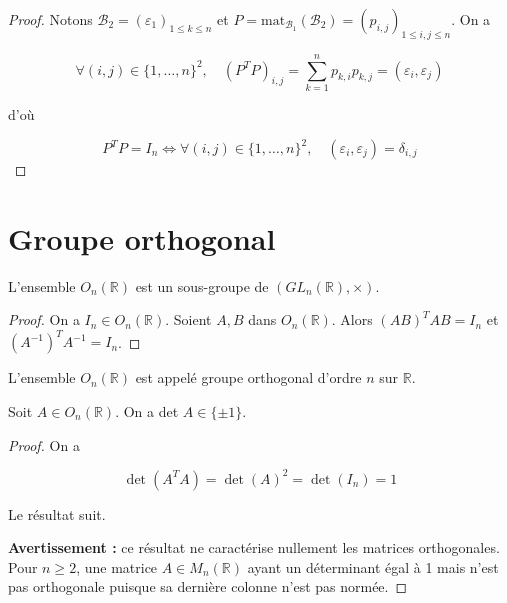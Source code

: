 \begin{proof}

Notons $\mathcal{B}_2 = (\varepsilon_1)_{1 \leq k \leq n}$ et $P = \text{mat}_{\mathcal{B}_1}(\mathcal{B}_2) = (p_{i,j})_{1 \leq i,j \leq n}$. On a

\[ \forall (i,j) \in \{1, \dots, n\}^2, \quad (P^T P)_{i,j} = \sum_{k=1}^n p_{k,i} p_{k,j} = (\varepsilon_i, \varepsilon_j) \]

d'où

\[ P^T P = I_n \Leftrightarrow \forall (i,j) \in \{1, \dots, n\}^2, \quad (\varepsilon_i, \varepsilon_j) = \delta_{i,j} \]

\end{proof}

\section{Groupe orthogonal}

\begin{proposition}
\label{prop:16}

L'ensemble $O_n(\mathbb{R})$ est un sous-groupe de $(GL_n(\mathbb{R}), \times)$.

\end{proposition}

\begin{proof}

On a $I_n \in O_n(\mathbb{R})$. Soient $A, B$ dans $O_n(\mathbb{R})$. Alors $(AB)^T AB = I_n$ et $(A^{-1})^T A^{-1} = I_n$.

\end{proof}

\begin{definition}
\label{def:8}

L'ensemble $O_n(\mathbb{R})$ est appelé groupe orthogonal d'ordre $n$ sur $\mathbb{R}$.

\end{definition}

\begin{proposition}
\label{prop:17}

Soit $A \in O_n(\mathbb{R})$. On a det $A \in \{ \pm 1 \}$.

\end{proposition}

\begin{proof}

On a

\[ \det(A^T A) = \det(A)^2 = \det(I_n) = 1 \]

Le résultat suit.

\textbf{Avertissement :} ce résultat ne caractérise nullement les matrices orthogonales. Pour $n \geq 2$, une matrice $A \in M_n(\mathbb{R})$ ayant un déterminant égal à 1 mais n'est pas orthogonale puisque sa dernière colonne n'est pas normée.

\end{proof}

